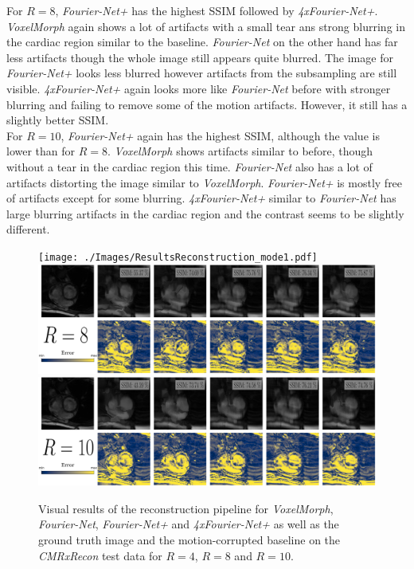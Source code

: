 For $R=8$, \emph{Fourier-Net+} has the highest SSIM followed by \emph{4xFourier-Net+}. \emph{VoxelMorph} again shows a lot of artifacts with a small tear ans strong blurring in the cardiac region similar to the baseline. \emph{Fourier-Net} on the other hand has far less artifacts though the whole image still appears quite blurred. The image for \emph{Fourier-Net+} looks less blurred however artifacts from the subsampling are still visible. \emph{4xFourier-Net+} again looks more like \emph{Fourier-Net} before with stronger blurring and failing to remove some of the motion artifacts. However, it still has a slightly better SSIM.\\
For $R=10$, \emph{Fourier-Net+} again has the highest SSIM, although the value is lower than for $R=8$. \emph{VoxelMorph} shows artifacts similar to before, though without a tear in the cardiac region this time. \emph{Fourier-Net} also has a lot of artifacts distorting the image similar to \emph{VoxelMorph}. \emph{Fourier-Net+} is mostly free of artifacts except for some blurring. \emph{4xFourier-Net+} similar to \emph{Fourier-Net} has large blurring artifacts in the cardiac region and the contrast seems to be slightly different.

\begin{figure}[H] %
	\centering
	\texttt{[image: ./Images/ResultsReconstruction\_mode1.pdf]} 
	\includegraphics[width=\textwidth]{./Images/ResultsReconstruction_mode2.pdf}
	\includegraphics[width=\textwidth]{./Images/ResultsReconstruction_mode3.pdf}
	\caption{Visual results of the reconstruction pipeline for \emph{VoxelMorph}, \emph{Fourier-Net}, \emph{Fourier-Net+} and \emph{4xFourier-Net+} as well as the ground truth image and the motion-corrupted baseline on the \emph{CMRxRecon} test data for $R=4$, $R=8$ and $R=10$.}
	\label{fig:ResultsReconstruction}
\end{figure}